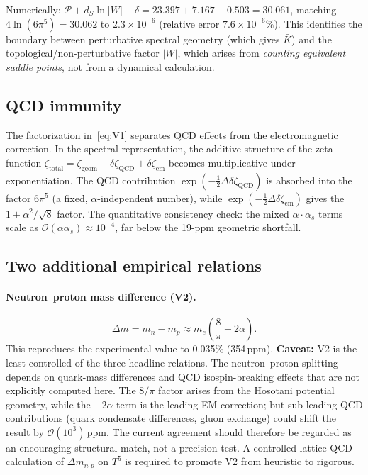 \documentclass[11pt,a4paper]{article}
\theoremstyle{definition}
\theoremstyle{remark}
\begin{document}
\noindent
Numerically:
$\mathcal{P}+d_S\ln|W|-\delta=23.397+7.167-0.503=30.061$,
matching $4\ln(6\pi^5)=30.062$ to $2.3\times 10^{-6}$
(relative error $7.6\times 10^{-6}\%$).
This identifies the boundary between perturbative spectral geometry
(which gives $\bar K$) and the topological/non-perturbative factor
$|W|$, which arises from \emph{counting equivalent saddle points},
not from a dynamical calculation.

\subsection{QCD immunity}

The factorization in~\eqref{eq:V1} separates QCD effects from the
electromagnetic correction.  In the spectral representation, the
additive structure of the zeta function
$\zeta_{\mathrm{total}}=\zeta_{\mathrm{geom}}+\delta\zeta_{\mathrm{QCD}}
+\delta\zeta_{\mathrm{em}}$ becomes multiplicative under exponentiation.
The QCD contribution $\exp(-\tfrac12\Delta\delta\zeta_{\mathrm{QCD}})$
is absorbed into the factor $6\pi^5$ (a fixed, $\alpha$-independent
number), while $\exp(-\tfrac12\Delta\delta\zeta_{\mathrm{em}})$ gives
the $1+\alpha^2/\sqrt{8}$ factor.  The quantitative consistency check:
the mixed $\alpha\cdot\alpha_s$ terms scale as $\mathcal{O}(\alpha\alpha_s)
\approx 10^{-4}$, far below the 19-ppm geometric shortfall.

\subsection{Two additional empirical relations}

\paragraph{Neutron--proton mass difference (V2).}
\begin{equation}
  \Delta m = m_n-m_p \approx m_e\!\left(\frac{8}{\pi}-2\alpha\right).
\end{equation}
This reproduces the experimental value to 0.035\% (354\,ppm).
\textbf{Caveat:} V2 is the least controlled of the three headline
relations.  The neutron--proton splitting depends on quark-mass
differences and QCD isospin-breaking effects that are not explicitly
computed here.  The $8/\pi$ factor arises from the Hosotani potential
geometry, while the $-2\alpha$ term is the leading EM correction; but
sub-leading QCD contributions (quark condensate differences, gluon
exchange) could shift the result by $\mathcal{O}(10^3)\,$ppm.
The current agreement should therefore be regarded as an encouraging
structural match, not a precision test.  A controlled lattice-QCD
calculation of $\Delta m_{n\mbox{-}p}$ on $T^5$ is required to promote
V2 from heuristic to rigorous.
\end{document}
